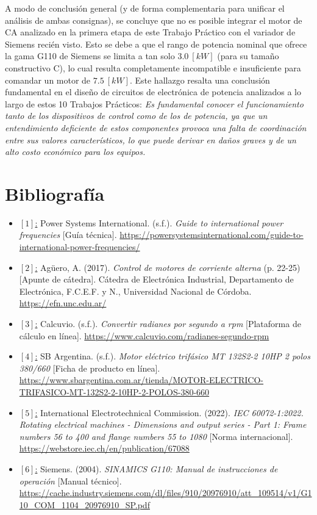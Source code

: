 \documentclass[12pt,a4paper]{article}
\begin{document}
A modo de conclusión general (y de forma complementaria para unificar el análisis de ambas consignas), se concluye que no es posible integrar el motor de CA analizado en la primera etapa de este Trabajo Práctico con el variador de Siemens recién visto. Esto se debe a que el rango de potencia nominal que ofrece la gama G110 de Siemens se limita a tan solo $3.0 \ [kW]$ (para su tamaño constructivo C), lo cual resulta completamente incompatible e insuficiente para comandar un motor de $7.5 \ [kW]$. Este hallazgo resalta una conclusión fundamental en el diseño de circuitos de electrónica de potencia analizados a lo largo de estos 10 Trabajos Prácticos: \textit{Es fundamental conocer el funcionamiento tanto de los dispositivos de control como de los de potencia, ya que un entendimiento deficiente de estos componentes provoca una falta de coordinación entre sus valores característicos, lo que puede derivar en daños graves y de un alto costo económico para los equipos.}



\section{Bibliografía}
\begin{itemize}
    \raggedright
    \item \underline{$[1]$:} Power Systems International. (s.f.). \textit{Guide to international power frequencies} [Guía técnica]. \url{https://powersystemsinternational.com/guide-to-international-power-frequencies/}

    \item \underline{$[2]$:} Agüero, A. (2017). \textit{Control de motores de corriente alterna} (p. 22-25) [Apunte de cátedra]. Cátedra de Electrónica Industrial, Departamento de Electrónica, F.C.E.F. y N., Universidad Nacional de Córdoba. \url{https://efn.unc.edu.ar/}

    \item \underline{$[3]$:} Calcuvio. (s.f.). \textit{Convertir radianes por segundo a rpm} [Plataforma de cálculo en línea]. \url{https://www.calcuvio.com/radianes-segundo-rpm}

    \item \underline{$[4]$:} SB Argentina. (s.f.). \textit{Motor eléctrico trifásico MT 132S2-2 10HP 2 polos 380/660} [Ficha de producto en línea]. \url{https://www.sbargentina.com.ar/tienda/MOTOR-ELECTRICO-TRIFASICO-MT-132S2-2-10HP-2-POLOS-380-660}

    \item \underline{$[5]$:} International Electrotechnical Commission. (2022). \textit{IEC 60072-1:2022. Rotating electrical machines - Dimensions and output series - Part 1: Frame numbers 56 to 400 and flange numbers 55 to 1080} [Norma internacional]. \url{https://webstore.iec.ch/en/publication/67088}

    \item \underline{$[6]$:} Siemens. (2004). \textit{SINAMICS G110: Manual de instrucciones de operación} [Manual técnico]. \url{https://cache.industry.siemens.com/dl/files/910/20976910/att_109514/v1/G110_COM_1104_20976910_SP.pdf}
    
\end{itemize}
\end{document}
